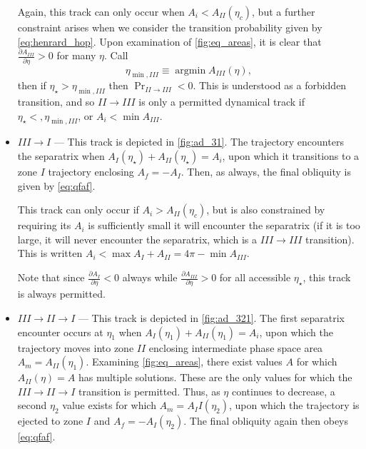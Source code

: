 \documentclass[
        fleqn,
        usenatbib,
    ]{mnras}
\newcommand*{\pd}[2]{\frac{\partial#1}{\partial#2}}
\DeclareMathOperator*{\argmin}{argmin}
\begin{document}
\begin{itemize}
        Again, this track can only occur when $A_i < A_{II}(\eta_c)$, but a
        further constraint arises when we consider the transition probability
        given by \autoref{eq:henrard_hop}. Upon examination of
        \autoref{fig:eq_areas}, it is clear that $\pd{A_{III}}{\eta} > 0$ for
        many $\eta$. Call
        \begin{equation}
            \eta_{\min, III} \equiv \argmin A_{III}(\eta),
        \end{equation}
        then if $\eta_\star > \eta_{\min, III}$ then $\Pr_{II \to III} < 0$.
        This is understood as a forbidden transition, and so $II \to III$ is
        only a permitted dynamical track if $\eta_\star <, \eta_{\min,
        III}$, or $A_i < \min A_{III}$.

    \item $III \to I$ --- This track is depicted in \autoref{fig:ad_31}.
        The trajectory encounters the separatrix when $A_I(\eta_\star) +
        A_{II}(\eta_\star) = A_i$, upon which it transitions to a zone $I$
        trajectory enclosing $A_f = -A_I$. Then, as always, the final obliquity
        is given by \autoref{eq:qfaf}.

        This track can only occur if $A_i > A_{II}(\eta_c)$, but is also
        constrained by requiring its $A_i$ is sufficiently small it will
        encounter the separatrix (if it is too large, it will never encounter
        the separatrix, which is a $III \to III$ transition). This is written
        $A_i < \max A_I + A_{II} = 4\pi - \min A_{III}$.

        Note that since $\pd{A_I}{\eta} < 0$ always while $\pd{A_{III}}{\eta} >
        0$ for all accessible $\eta_{\star}$, this track is always permitted.

    \item $III \to II \to I$ --- This track is depicted in \autoref{fig:ad_321}.
        The first separatrix encounter occurs at $\eta_1$ when $A_I(\eta_1) +
        A_{II}(\eta_1) = A_i$, upon which the trajectory moves into zone $II$
        enclosing intermediate phase space area $A_m = A_{II}(\eta_1)$.
        Examining \autoref{fig:eq_areas}, there exist values $A$ for which
        $A_{II}(\eta) = A$ has multiple solutions. These are the only values for
        which the $III \to II \to I$ transition is permitted. Thus, as $\eta$
        continues to decrease, a second $\eta_2$ value exists for which $A_m =
        A_II(\eta_2)$, upon which the trajectory is ejected to zone $I$ and $A_f
        = -A_I(\eta_2)$. The final obliquity again then obeys \autoref{eq:qfaf}.


\end{itemize}
\end{document}
